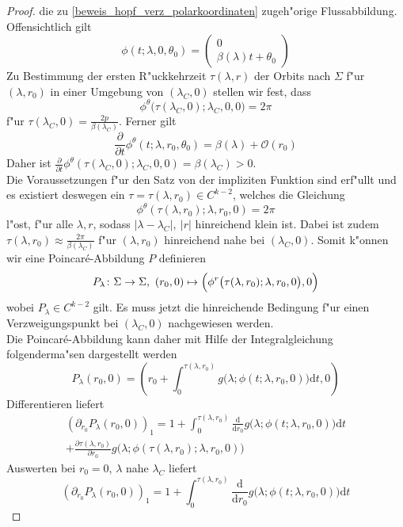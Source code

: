 \documentclass[a4paper, 13pt]{scrreprt}
\theoremstyle{definition} \newtheorem{definition}{Definition}[section]
\begin{document}
\begin{proof}
die zu \eqref{beweis_hopf_verz_polarkoordinaten} zugeh"orige Flussabbildung. Offensichtlich gilt $$\phi(t;\lambda,0,\theta_0) = \begin{pmatrix}0\\ \beta(\lambda)t+\theta_0\end{pmatrix}$$
Zu Bestimmung der ersten R"uckkehrzeit $\tau(\lambda, r)$ der Orbits nach $\Sigma$ f"ur $(\lambda, r_0)$ in einer Umgebung von $(\lambda_C, 0)$ stellen wir fest, dass
$$\phi^\theta\bigl(\tau(\lambda_C,0);\lambda_C,0,0\bigr) = 2\pi$$
f"ur $\tau(\lambda_C, 0) = \frac{2p}{\beta(\lambda_C)}$. Ferner gilt
$$\frac{\partial}{\partial t} \phi^\theta(t;\lambda,r_0,\theta_0) = \beta(\lambda) + \mathcal{O}(r_0)$$
Daher ist $\frac{\partial}{\partial t}\phi^\theta(\tau(\lambda_C,0);\lambda_C,0,0) = \beta(\lambda_C) > 0$. \\
Die Voraussetzungen f"ur den Satz von der impliziten Funktion sind erf"ullt und es existiert deswegen ein $\tau = \tau(\lambda,r_0) \in C^{k-2}$, welches die Gleichung
$$\phi^\theta(\tau(\lambda, r_0);\lambda,r_0,0) = 2\pi$$
l"ost, f"ur alle $\lambda,r$, sodass $|\lambda-\lambda_C|, \ |r|$ hinreichend klein ist. Dabei ist zudem $\tau(\lambda, r_0) \approx \frac{2\pi}{\beta(\lambda_C)}$ f"ur $(\lambda, r_0)$ hinreichend nahe bei $(\lambda_C, 0)$. Somit k"onnen wir eine Poincar\'{e}-Abbildung $P$ definieren
$$ P_\lambda \colon \Sigma \to \Sigma,\ (r_0, 0) \mapsto \Bigl(\phi^r\bigl(\tau(\lambda, r_0);\lambda,r_0,0\bigr), 0\Bigr)$$
wobei $P_\lambda\in C^{k-2}$ gilt. Es muss jetzt die hinreichende Bedingung f"ur einen Verzweigungspunkt bei $(\lambda_C, 0)$ nachgewiesen werden.\\
Die Poincar\'{e}-Abbildung kann daher mit Hilfe der Integralgleichung folgenderma"sen dargestellt werden
$$P_\lambda(r_0, 0) = \left(r_0 + \int_0^{\tau(\lambda, r_0)}{g\bigl(\lambda; \phi(t; \lambda, r_0, 0)\bigr) \mathrm dt}, 0\right)$$
Differentieren liefert
\begin{align*}
\left(\partial_{r_0} P_\lambda(r_0, 0)\right)_1 = 1 + \int_0^{\tau(\lambda, r_0)}{\frac{\mathrm{d}}{\mathrm dr_0}g\bigl(\lambda; \phi(t; \lambda, r_0, 0)\bigr)\mathrm dt} \\+ \frac{\partial \tau(\lambda,r_0)}{\partial r_0}g\bigl(\lambda; \phi(\tau(\lambda, r_0); \lambda, r_0, 0)\bigr)
\end{align*}
Auswerten bei $r_0=0$, $\lambda$ nahe $\lambda_C$ liefert
$$\left(\partial_{r_0} P_\lambda(r_0, 0)\right)_1 = 1 + \int_0^{\tau(\lambda, r_0)}{\frac{\mathrm{d}}{\mathrm dr_0}g\bigl(\lambda; \phi(t; \lambda, r_0, 0)\bigr)\mathrm dt} $$

\end{proof}
\end{document}
